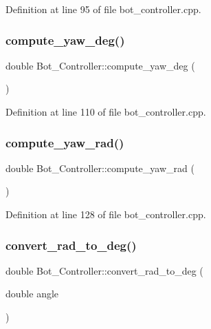 Definition at line 95 of file bot\+\_\+controller.\+cpp.

\mbox{\label{class_bot___controller_ad9ed858063dc3f928157122e95e677ae}} 
\subsubsection{\texorpdfstring{compute\+\_\+yaw\+\_\+deg()}{compute\_yaw\_deg()}}
{\footnotesize\ttfamily double Bot\+\_\+\+Controller\+::compute\+\_\+yaw\+\_\+deg (\begin{DoxyParamCaption}{ }\end{DoxyParamCaption})}



Definition at line 110 of file bot\+\_\+controller.\+cpp.

\mbox{\label{class_bot___controller_af23e3dd2a3af58bc16fda4aebbd78c18}} 
\subsubsection{\texorpdfstring{compute\+\_\+yaw\+\_\+rad()}{compute\_yaw\_rad()}}
{\footnotesize\ttfamily double Bot\+\_\+\+Controller\+::compute\+\_\+yaw\+\_\+rad (\begin{DoxyParamCaption}{ }\end{DoxyParamCaption})}



Definition at line 128 of file bot\+\_\+controller.\+cpp.

\mbox{\label{class_bot___controller_ad07d6cfa7f66b200a1540221b699b48e}} 
\subsubsection{\texorpdfstring{convert\+\_\+rad\+\_\+to\+\_\+deg()}{convert\_rad\_to\_deg()}}
{\footnotesize\ttfamily double Bot\+\_\+\+Controller\+::convert\+\_\+rad\+\_\+to\+\_\+deg (\begin{DoxyParamCaption}\item[{double}]{angle }\end{DoxyParamCaption})}




